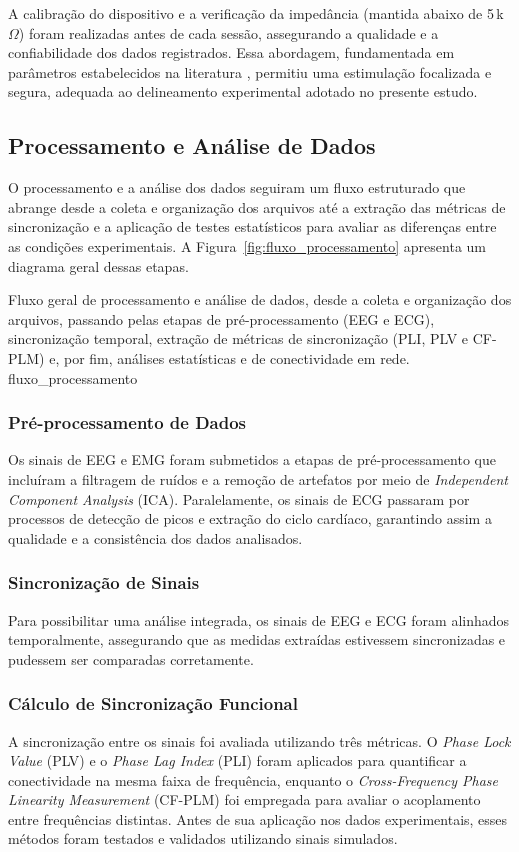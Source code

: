 A calibração do dispositivo e a verificação da impedância (mantida abaixo de 5\,k$\Omega$) foram realizadas antes de cada sessão, assegurando a qualidade e a confiabilidade dos dados registrados. Essa abordagem, fundamentada em parâmetros estabelecidos na literatura \cite{datta2008transcranial, stagg2011physiological}, permitiu uma estimulação focalizada e segura, adequada ao delineamento experimental adotado no presente estudo.


\subsection{Processamento e Análise de Dados}
O processamento e a análise dos dados seguiram um fluxo estruturado que abrange desde a coleta e organização dos arquivos até a extração das métricas de sincronização e a aplicação de testes estatísticos para avaliar as diferenças entre as condições experimentais. A Figura~\ref{fig:fluxo_processamento} apresenta um diagrama geral dessas etapas.

{Fluxo geral de processamento e análise de dados, desde a coleta e organização dos arquivos, passando pelas etapas de pré-processamento (EEG e ECG), sincronização temporal, extração de métricas de sincronização (PLI, PLV e CF-PLM) e, por fim, análises estatísticas e de conectividade em rede.}
{fluxo_processamento}

\subsubsection{Pré-processamento de Dados}
Os sinais de EEG e EMG foram submetidos a etapas de pré-processamento que incluíram a filtragem de ruídos e a remoção de artefatos por meio de \textit{Independent Component Analysis} (ICA). Paralelamente, os sinais de ECG passaram por processos de detecção de picos e extração do ciclo cardíaco, garantindo assim a qualidade e a consistência dos dados analisados.

\subsubsection{Sincronização de Sinais}
Para possibilitar uma análise integrada, os sinais de EEG e ECG foram alinhados temporalmente, assegurando que as medidas extraídas estivessem sincronizadas e pudessem ser comparadas corretamente.

\subsubsection{Cálculo de Sincronização Funcional}
A sincronização entre os sinais foi avaliada utilizando três métricas. O \textit{Phase Lock Value} (PLV) e o \textit{Phase Lag Index} (PLI) foram aplicados para quantificar a conectividade na mesma faixa de frequência, enquanto o \textit{Cross-Frequency Phase Linearity Measurement} (CF-PLM) foi empregada para avaliar o acoplamento entre frequências distintas. Antes de sua aplicação nos dados experimentais, esses métodos foram testados e validados utilizando sinais simulados.

